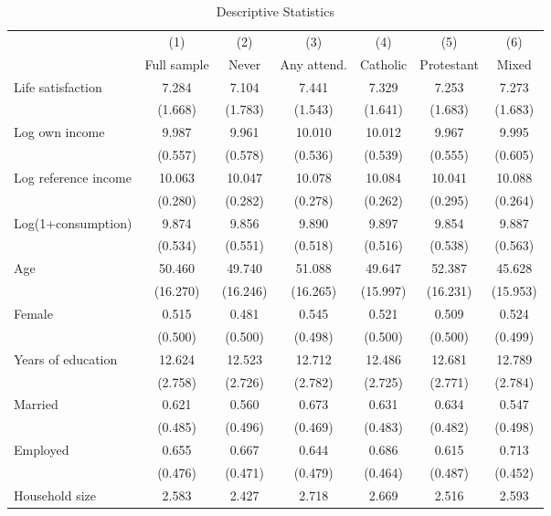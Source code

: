 \begin{table}[!htbp]
\centering
\caption{Descriptive Statistics}
\label{tab:appendix_descriptive_statistics}
\begingroup
\scriptsize
\setlength{\tabcolsep}{5.5pt}
\renewcommand{\arraystretch}{1.12}
\begin{adjustbox}{max width=1.00\textwidth,center}
\begin{tabular}{lcccccc}
\toprule
 & (1) & (2) & (3) & (4) & (5) & (6) \\
\cmidrule(lr){2-7}
 & Full sample & Never & Any attend. & Catholic & Protestant & Mixed \\
\midrule
Life satisfaction & 7.284 & 7.104 & 7.441 & 7.329 & 7.253 & 7.273 \\
  & (1.668) & (1.783) & (1.543) & (1.641) & (1.683) & (1.683) \\
Log own income & 9.987 & 9.961 & 10.010 & 10.012 & 9.967 & 9.995 \\
  & (0.557) & (0.578) & (0.536) & (0.539) & (0.555) & (0.605) \\
Log reference income & 10.063 & 10.047 & 10.078 & 10.084 & 10.041 & 10.088 \\
  & (0.280) & (0.282) & (0.278) & (0.262) & (0.295) & (0.264) \\
Log(1+consumption) & 9.874 & 9.856 & 9.890 & 9.897 & 9.854 & 9.887 \\
  & (0.534) & (0.551) & (0.518) & (0.516) & (0.538) & (0.563) \\
Age & 50.460 & 49.740 & 51.088 & 49.647 & 52.387 & 45.628 \\
  & (16.270) & (16.246) & (16.265) & (15.997) & (16.231) & (15.953) \\
Female & 0.515 & 0.481 & 0.545 & 0.521 & 0.509 & 0.524 \\
  & (0.500) & (0.500) & (0.498) & (0.500) & (0.500) & (0.499) \\
Years of education & 12.624 & 12.523 & 12.712 & 12.486 & 12.681 & 12.789 \\
  & (2.758) & (2.726) & (2.782) & (2.725) & (2.771) & (2.784) \\
Married & 0.621 & 0.560 & 0.673 & 0.631 & 0.634 & 0.547 \\
  & (0.485) & (0.496) & (0.469) & (0.483) & (0.482) & (0.498) \\
Employed & 0.655 & 0.667 & 0.644 & 0.686 & 0.615 & 0.713 \\
  & (0.476) & (0.471) & (0.479) & (0.464) & (0.487) & (0.452) \\
Household size & 2.583 & 2.427 & 2.718 & 2.669 & 2.516 & 2.593 \\

\end{tabular}
\end{adjustbox}
\end{table}

